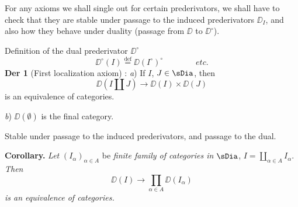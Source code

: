 For any axioms we shall single out for certain prederivators, we shall have to check that they are stable under passage to the induced prederivators $\DD_I$, and also how they behave under duality (passage from $\DD$ to $\DD^\circ$). %

Definition of the dual prederivator $\DD^\circ$
\[ \DD^\circ(I) \overset{\text{def}}{=} \DD(I^\circ)^\circ \qquad\qquad \textit{etc.} \]
\textbf{Der 1} (First localization axiom) : \textit{a}) If $I$, $J \in \sDia$, then
\[ \DD(I \amalg J) \longrightarrow \DD(I) \times \DD(J) \]
is an equivalence of categories.

\textit{b}) $\DD(\emptyset)$ is the final category.

Stable under passage to the induced prederivators, and passage to the dual.

\textbf{Corollary.} \textit{Let} $(I_\alpha)_{\alpha \in A}$ be \textit{finite family of categories in} $\sDia$, $I = \coprod\limits_{\alpha \in A} I_\alpha$. \textit{Then}
\[ \DD(I) \longrightarrow \prod_{\alpha \in A} \DD(I_\alpha) \]
\textit{is an equivalence of categories.}
